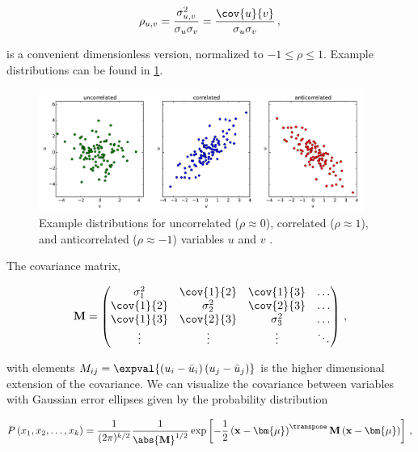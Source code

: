 \begin{equation}\label{eq:stats:corr}
\rho_{u,v} = \frac{\sigma_{u,v}^{2}}{\sigma_{u}\sigma_{v}} = \frac{\cov{u}{v}}{\sigma_{u}\sigma_{v}}\,,
\end{equation}

\noindent is a convenient dimensionless version, normalized to $-1 \leq \rho \leq 1$.
Example distributions can be found in \cref{fig:stats:corr_ex}.

\begin{figure}
\centering
\includegraphics[width=0.95\textwidth]{figures/stats/corr_ex.pdf}
\caption{
Example distributions for
uncorrelated ($\rho \approx 0$),
correlated ($\rho \approx 1$),
and anticorrelated ($\rho \approx -1$)
variables $u$ and $v$ \cite{DougNotes}.
}
\label{fig:stats:corr_ex}
\end{figure}

The covariance matrix,

\begin{align}
  \mathbf{M} = \begin{pmatrix}
    \sigma_1^2   & \cov{1}{2} & \cov{1}{3} & \ldots \\
    \cov{1}{2}   & \sigma_2^2 & \cov{2}{3} & \ldots \\
    \cov{1}{3}   & \cov{2}{3} & \sigma_3^2 & \ldots \\
    \vdots       & \vdots     & \vdots     & \ddots
  \end{pmatrix}\,,
\end{align}

\noindent with elements $M_{ij} = \expval{\left(u_{i} - \bar{u}_{i}\right)\left(u_{j}-\bar{u}_{j}\right)}$
is the higher dimensional extension of the covariance.
We can visualize the covariance between variables with
Gaussian error ellipses given by the probability distribution

\begin{equation}\label{eq:stats:P_error_ellipse_k}
P\left(x_{1},x_{2},\ldots,x_{k}\right) = \frac{1}{(2\pi)^{k/2}}\frac{1}{\abs{\mathbf{M}}^{1/2}}\exp\left[-\frac{1}{2}\left(\mathbf{x}-\bm{\mu}\right)^{\transpose}\mathbf{M}\left(\mathbf{x}-\bm{\mu}\right)\right]\,,
\end{equation}

